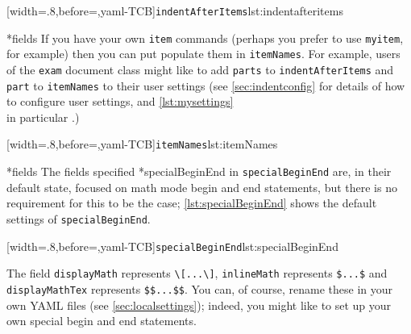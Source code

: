  \begin{cmhtcbraster}[raster columns=3,
   raster left skip=-3.5cm,
   raster right skip=-2cm,
   raster column skip=.03\linewidth]
  [width=.8\linewidth,before=\centering,yaml-TCB]{\texttt{indentAfterItems}}{lst:indentafteritems}
 \end{cmhtcbraster}

*{fields}
 If you have your own \texttt{item} commands (perhaps you prefer to use \texttt{myitem},
 for example) then you can put populate them in \texttt{itemNames}. For example, users of
 the \texttt{exam} document class might like to add \texttt{parts} to
 \texttt{indentAfterItems} and \texttt{part} to \texttt{itemNames} to their user settings
 (see \vref{sec:indentconfig} for details of how to configure user settings, and
 \vref{lst:mysettings} \\ in particular \label{page:examsettings}.)

 [width=.8\linewidth,before=\centering,yaml-TCB]{\texttt{itemNames}}{lst:itemNames}

*{fields}\label{yaml:specialBeginEnd}
 The fields specified 
 *{specialBeginEnd} in \texttt{specialBeginEnd} are, in their
 default state, focused on math mode begin and end statements, but there is no
 requirement for this to be the case; \cref{lst:specialBeginEnd} shows the default
 settings of \texttt{specialBeginEnd}. %

 [width=.8\linewidth,before=\centering,yaml-TCB]{\texttt{specialBeginEnd}}{lst:specialBeginEnd}

 The field \texttt{displayMath} represents \lstinline!\[...\]!, \texttt{inlineMath}
 represents \lstinline!$...$! and \texttt{displayMathTex} represents \lstinline!$$...$$!.
 You can, of course, rename these in your own YAML files (see \vref{sec:localsettings});
 indeed, you might like to set up your own special begin and end statements.

